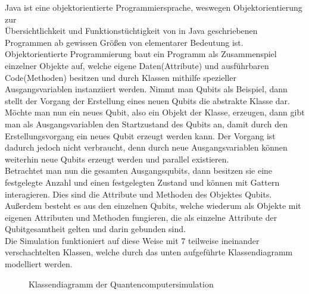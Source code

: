 \documentclass[12pt]{report}
\begin{document}
Java ist eine objektorientierte Programmiersprache, weswegen Objektorientierung zur
\\ %
Übersichtlichkeit und Funktionstüchtigkeit von in Java geschriebenen Programmen ab gewissen Größen von elementarer Bedeutung ist.
Objektorientierte Programmierung baut ein Programm als Zusammenspiel einzelner Objekte auf, welche eigene Daten(Attribute) und ausführbaren Code(Methoden) besitzen und durch Klassen mithilfe spezieller Ausgangsvariablen instanziiert werden. Nimmt man Qubits als Beispiel, dann stellt der Vorgang der Erstellung eines neuen Qubits die abstrakte Klasse dar. Möchte man nun ein neues Qubit, also ein Objekt der Klasse, erzeugen, dann gibt man als Ausgangsvariablen den Startzustand des Qubits an, damit durch den Erstellungsvorgang ein neues Qubit erzeugt werden kann.  Der Vorgang ist dadurch jedoch nicht verbraucht, denn durch neue Ausgangsvariablen können weiterhin neue Qubits erzeugt werden und parallel existieren.\\
Betrachtet man nun die gesamten Ausgangsqubits, dann besitzen sie eine festgelegte Anzahl und  einen festgelegten Zustand und können mit Gattern interagieren. Dies sind die Attribute und Methoden des Objektes \glqq Qubits\grqq. Außerdem besteht es aus den einzelnen Qubits, welche wiederum als Objekte mit eigenen Attributen und Methoden fungieren, die als einzelne Attribute der Qubitgesamtheit gelten und darin gebunden sind.\\
Die Simulation funktioniert auf diese Weise mit 7 teilweise ineinander verschachtelten Klassen, welche durch das unten aufgeführte Klassendiagramm modelliert werden.
\begin{figure}
	\centering
	\vspace{-1.8cm}
	\centering
	\caption{Klassendiagramm der Quantencomputersimulation}
\end{figure}
\newpage
\end{document}
